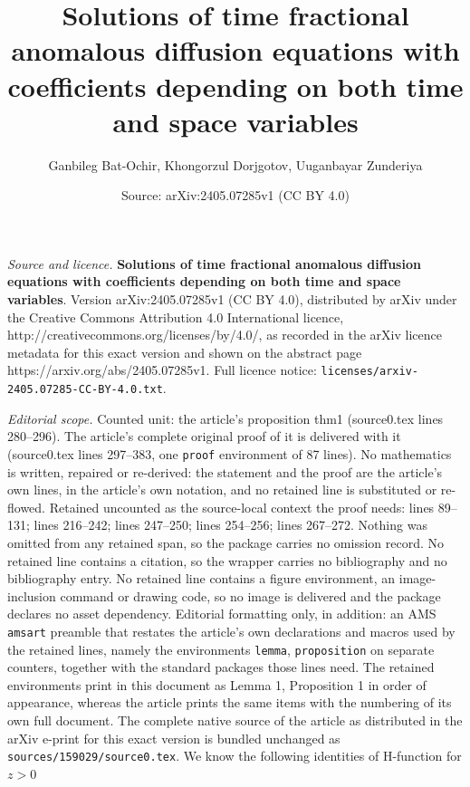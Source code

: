 \documentclass[10pt,a4paper]{amsart}
\title{\textbf{Solutions of time fractional anomalous diffusion equations with coefficients depending on both time and space variables}}
\author{Ganbileg Bat-Ochir, Khongorzul Dorjgotov, Uuganbayar Zunderiya}
\date{Source: arXiv:2405.07285v1 (CC BY 4.0)}
\begin{document}
\maketitle

\noindent\emph{Source and licence.} \textbf{Solutions of time fractional anomalous diffusion equations with coefficients depending on both time and space variables}. Version arXiv:2405.07285v1 (CC BY 4.0), distributed by arXiv under the Creative Commons Attribution 4.0 International licence, http://creativecommons.org/licenses/by/4.0/, as recorded in the arXiv licence metadata for this exact version and shown on the abstract page https://arxiv.org/abs/2405.07285v1. Full licence notice: \texttt{licenses/arxiv-2405.07285-CC-BY-4.0.txt}.\par\smallskip

\noindent\textit{Editorial scope.} Counted unit: the article's proposition thm1 (source0.tex lines 280--296). The article's complete original proof of it is delivered with it (source0.tex lines 297--383, one \texttt{proof} environment of 87 lines). No mathematics is written, repaired or re-derived: the statement and the proof are the article's own lines, in the article's own notation, and no retained line is substituted or re-flowed.  Retained uncounted as the source-local context the proof needs: lines 89--131; lines 216--242; lines 247--250; lines 254--256; lines 267--272.  Nothing was omitted from any retained span, so the package carries no omission record.  No retained line contains a citation, so the wrapper carries no bibliography and no bibliography entry.  No retained line contains a figure environment, an image-inclusion command or drawing code, so no image is delivered and the package declares no asset dependency.  Editorial formatting only, in addition: an AMS \texttt{amsart} preamble that restates the article's own declarations and macros used by the retained lines, namely the environments \texttt{lemma}, \texttt{proposition} on separate counters, together with the standard packages those lines need.  The retained environments print in this document as Lemma 1, Proposition 1 in order of appearance, whereas the article prints the same items with the numbering of its own full document.  The complete native source of the article as distributed in the arXiv e-print for this exact version is bundled unchanged as \texttt{sources/159029/source0.tex}.
We know the following identities of H-function for $z>0$
\end{document}
